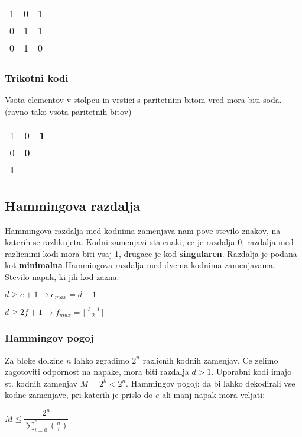 \documentclass{article}
\begin{document}
\begin{multicols}{4}
\begin{center}
    \begin{tabular}{ |c|cc| } 
        \hline
            1   & 0 & 1 \\ 
            0   & 1 & 1 \\ 
            \hline
            0   & 1 & 0 \\ 
        \hline
    \end{tabular}
\end{center}

\subsubsection{Trikotni kodi}
Vsota elementov v stolpcu in vrstici s paritetnim bitom vred mora biti soda. (ravno tako vsota paritetnih bitov)
\begin{center}
    \begin{tabular}{ ccc } 
        1   & 0 & \textbf{1} \\ 
        0   & \textbf{0} &  \\ 
        \textbf{1}   &  &  \\ 
    \end{tabular}
\end{center}

\subsection{Hammingova razdalja}
Hammingova razdalja med kodnima zamenjava nam pove stevilo znakov, na katerih se razlikujeta. Kodni zamenjavi sta enaki,
ce je razdalja 0, razdalja med razlicnimi kodi mora biti vsaj 1, drugace je kod \textbf{singularen}.
Razdalja je podana kot \textbf{minimalna} Hammingova razdalja med dvema kodnima zamenjavama.
Stevilo napak, ki jih kod zazna:
\begin{center}
    $d \geq e + 1 \rightarrow e_{max} = d-1$
\end{center}
\begin{center}
    $d \geq 2f + 1 \rightarrow f_{max} = \lfloor \frac{d-1}{2} \rfloor$
\end{center}

\subsubsection{Hammingov pogoj}
Za bloke dolzine $n$ lahko zgradimo $2^n$ razlicnih kodnih zamenjav. Ce zelimo zagotoviti odpornost na napake,
mora biti razdalja $d > 1$. Uporabni kodi imajo st. kodnih zamenjav $M = 2^k < 2^n$.
Hammingov pogoj: da bi lahko dekodirali vse kodne zamenjave, pri katerih je prislo do $e$ ali manj napak
mora veljati:
\begin{center}
    \begin{math}
        M \leq \dfrac{2^n}{\sum_{i=0}^e{n \choose i}}
    \end{math}
\end{center}


\end{multicols}
\end{document}
